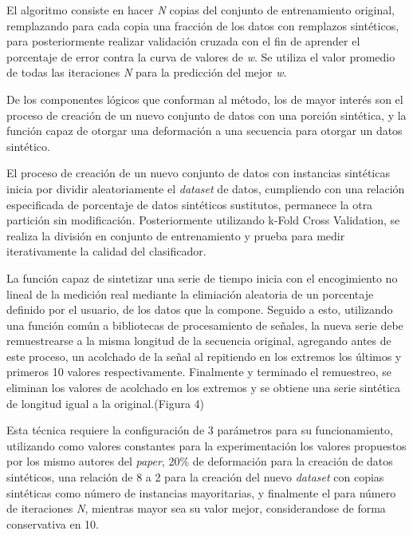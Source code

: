 	\hfill\break
	\justifying
	El algoritmo consiste en hacer \textit{N} copias del conjunto de entrenamiento original, remplazando para cada copia una fracción de los datos con remplazos sintéticos, para posteriormente realizar validación cruzada con el fin de aprender el porcentaje de error contra la curva de valores de \textit{w}. Se utiliza el valor promedio de todas las iteraciones \textit{N} para la predicción del mejor \textit{w}.
	
	\hfill\break
	\justifying
	De los componentes lógicos que conforman al método, los de mayor interés son el proceso de creación de un nuevo conjunto de datos con una porción sintética, y la función capaz de otorgar una deformación a una secuencia para otorgar un datos sintético.
	
	\hfill\break
	\justifying
	El proceso de creación de un nuevo conjunto de datos con instancias sintéticas inicia por dividir aleatoriamente el \textit{dataset} de datos, cumpliendo con una relación especificada de porcentaje de datos sintéticos sustitutos, permanece la otra partición sin modificación. Posteriormente utilizando k-Fold Cross Validation, se realiza la división en conjunto de entrenamiento y prueba para medir iterativamente la calidad del clasificador. 
	
	\hfill\break
	\justifying
	La función capaz de sintetizar una serie de tiempo inicia con el encogimiento no lineal de la medición real mediante la elimiación aleatoria de un porcentaje definido por el usuario, de los datos que la compone. Seguido a esto, utilizando una función común a bibliotecas de procesamiento de señales, la nueva serie debe remuestrearse a la misma longitud de la secuencia original, agregando antes de este proceso, un acolchado de la señal al repitiendo en los extremos los últimos y primeros 10 valores respectivamente. Finalmente y terminado el remuestreo, se eliminan los valores de acolchado en los extremos y se obtiene una serie sintética de longitud igual a la original.(Figura 4)
	
	\hfill\break
	\justifying
	Esta técnica requiere la configuración de 3 parámetros para su funcionamiento, utilizando como valores constantes para la experimentación los valores propuestos por los mismo autores del \textit{paper}, 20\% de deformación para la creación de datos sintéticos, una relación de 8 a 2 para la creación del nuevo \textit{dataset} con copias sintéticas como número de instancias mayoritarias, y finalmente el para número de iteraciones \textit{N}, mientras mayor sea su valor mejor, considerandose de forma conservativa en 10.  
	
